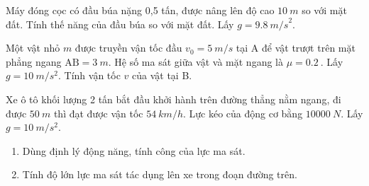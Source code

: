 \begin{ex}
	Máy đóng cọc có đầu búa nặng 0,5 tấn, được nâng lên độ cao $\SI{10}{m}$ so với mặt đất. Tính thế năng của đầu búa so với mặt đất. Lấy $g = \SI{9,8}{m/s}^2$.
\end{ex}
\begin{ex}
	Một vật nhỏ $m$ được truyền vận tốc đầu $v_0=\SI{5}{m/s}$ tại A để vật trượt trên mặt phẳng ngang $\text{AB} = \SI{3}{m}$. Hệ số ma sát giữa vật và mặt ngang là $\mu=\SI{0.2}{}$. Lấy $g=\SI{10}{m/s^2}$. Tính vận tốc $v$ của vật tại B.
\end{ex}
\begin{ex}
	Xe ô tô khối lượng 2 tấn bắt đầu khởi hành trên đường thẳng nằm ngang, đi được $\SI{50}{m}$ thì đạt được vận tốc $\SI{54}{km/h}$. Lực kéo của động cơ bằng $\SI{10000}{N}$. Lấy $g=\SI{10}{m/s^2}$.
	\begin{enumerate}[label=\alph*)]
		\item Dùng định lý động năng, tính công của lực ma sát.
		\item Tính độ lớn lực ma sát tác dụng lên xe trong đoạn đường trên.
	\end{enumerate}
\end{ex}

